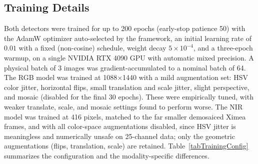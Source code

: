 \subsection{Training Details} \label{secTraining}

Both detectors were trained for up to 200 epochs (early-stop patience
50) with the AdamW optimizer auto-selected by the framework, an
initial learning rate of $0.01$ with a fixed (non-cosine) schedule,
weight decay $5\times10^{-4}$, and a three-epoch warmup, on a single
NVIDIA RTX 4090 GPU with automatic mixed precision.
A physical batch of 3 images was gradient-accumulated to a nominal
batch of 64.
The RGB model was trained at 1088$\times$1440 with a mild augmentation
set: HSV color jitter, horizontal flips, small translation and scale
jitter, slight perspective, and mosaic (disabled for the final 30
epochs). These were empirically tuned, with weaker translate, scale, and
mosaic settings found to perform worse.
The NIR model was trained at 416 pixels, matched to the far smaller
demosaiced Ximea frames, and with all color-space augmentations
disabled, since HSV jitter is meaningless and numerically unsafe on
25-channel data; only the geometric augmentations (flips, translation,
scale) are retained.
Table~\ref{tabTrainingConfig} summarizes the configuration and the
modality-specific differences.

